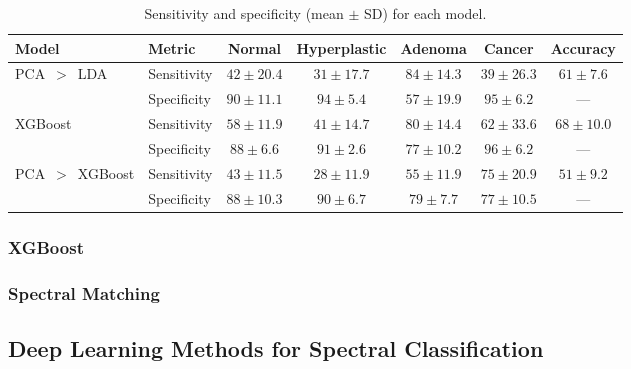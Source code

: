 \begin{table}[ht]
  \centering
  \caption{Sensitivity and specificity (mean $\pm$ SD) for each model.}
  \label{tab:model_performance}
  \begin{tabular}{@{}l l c c c c c@{}}
    \toprule
    Model & Metric & Normal & Hyperplastic & Adenoma & Cancer & Accuracy \\
    \midrule
    \multirow{2}{*}{PCA~$>$~LDA}
      & Sensitivity & $42\pm20.4$ & $31\pm17.7$ & $84\pm14.3$ & $39\pm26.3$ & $61\pm7.6$ \\
      & Specificity & $90\pm11.1$ & $94\pm5.4$  & $57\pm19.9$ & $95\pm6.2$  & — \\
    \midrule
    \multirow{2}{*}{XGBoost}
      & Sensitivity & $58\pm11.9$ & $41\pm14.7$ & $80\pm14.4$ & $62\pm33.6$ & $68\pm10.0$ \\
      & Specificity & $88\pm6.6$  & $91\pm2.6$  & $77\pm10.2$ & $96\pm6.2$  & — \\
    \midrule
    \multirow{2}{*}{PCA~$>$~XGBoost}
      & Sensitivity & $43\pm11.5$ & $28\pm11.9$ & $55\pm11.9$ & $75\pm20.9$ & $51\pm9.2$ \\
      & Specificity & $88\pm10.3$ & $90\pm6.7$  & $79\pm7.7$  & $77\pm10.5$ & — \\
    \bottomrule
  \end{tabular}
\end{table}


\subsubsection{XGBoost}
\subsubsection{Spectral Matching}


\subsection{Deep Learning Methods for Spectral Classification}
